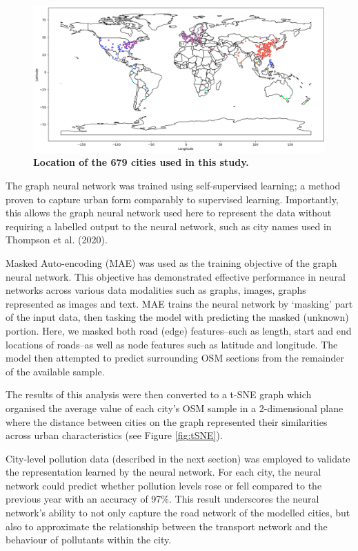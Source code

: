 \documentclass[preprint,12pt]{elsarticle}
\begin{document}
\begin{figure}
\centering
\includegraphics[trim={0 0 0 0},clip,scale=0.4]{Images/ByCountry_map_Zeigler.png}
\caption{\bf Location of the 679 cities used in this study.}
 \label{fig:clusters}
\end{figure}


The graph neural network was trained using self-supervised learning; a method proven to capture urban form comparably to supervised learning\cite{seneviratne2021self}. Importantly, this allows the graph neural network used here to represent the data without requiring a labelled output to the neural network, such as city names used in Thompson et al. (2020)\cite{Thompson2020}.

Masked Auto-encoding (MAE) was used as the training objective of the graph neural network. This objective has demonstrated effective performance in neural networks across various data modalities such as graphs\cite{hou2022graphmae}, images\cite{he2022masked}, graphs represented as images\cite{seneviratne2022self} and text\cite{devlin2018bert}. MAE trains the neural network by `masking' part of the input data, then tasking the model with predicting the masked (unknown) portion. Here, we masked both road (edge) features--such as length, start and end locations of roads--as well as node features such as latitude and longitude. The model then attempted to predict surrounding OSM sections from the remainder of the available sample. 

The results of this analysis were then converted to a t-SNE\cite{scikit-learn} graph which organised the average value of each city's OSM sample in a 2-dimensional plane where the distance between cities on the graph represented their similarities across urban characteristics (see Figure \ref{fig:tSNE}).

City-level pollution data (described in the next section) was employed to validate the representation learned by the neural network. For each city, the neural network could predict whether pollution levels rose or fell compared to the previous year with an accuracy of 97\%. This result underscores the neural network's ability to not only capture the road network of the modelled cities, but also to approximate the relationship between the transport network and the behaviour of pollutants within the city.
\end{document}
